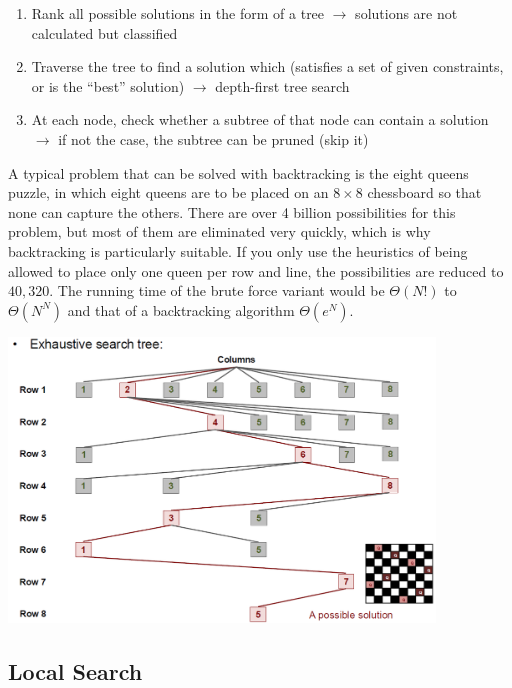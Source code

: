 \begin{enumerate}
    \item Rank all possible solutions in the form of a tree $\rightarrow$ solutions are not calculated but classified
    \item Traverse the tree to find a solution which (satisfies a set of given constraints, or is the “best” solution) $\rightarrow$ depth-first tree search
    \item At each node, check whether a subtree of that node can contain a solution $\rightarrow$ if not the case, the subtree can be pruned (skip it)
\end{enumerate}

A typical problem that can be solved with backtracking is the eight queens puzzle, in which eight queens are to be placed on an $8\times 8$ chessboard so that none can capture the others. There are over 4 billion possibilities for this problem, but most of them are eliminated very quickly, which is why backtracking is particularly suitable. If you only use the heuristics of being allowed to place only one queen per row and line, the possibilities are reduced to $40,320$. The running time of the brute force variant would be $\Theta(N!)$ to $\Theta(N^N)$ and that of a backtracking algorithm $\Theta(e^N)$.

\begin{center}\includegraphics[width=0.85\textwidth]{img/algorithms/BacktrackingEightQueens.png}\end{center}

%

\subsection{Local Search}



%